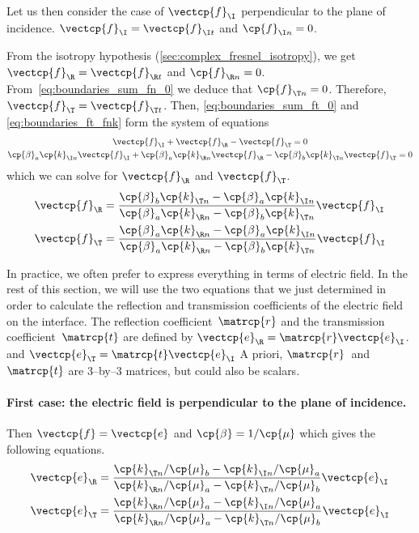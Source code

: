 Let us then consider the case of $\vectcp{f}_\I$ perpendicular to the plane of incidence.
$\vectcp{f}_\I=\vectcp{f}_{\I t}$ and $\cp{f}_{\I n}=0$.

From the isotropy hypothesis (\cref{sec:complex_fresnel_isotropy}), we get $\vectcp{f}_\R=\vectcp{f}_{\R t}$ and $\cp{f}_{\R n}=0$.
From~\cref{eq:boundaries_sum_fn_0} we deduce that $\cp{f}_{\T n}=0$.
Therefore, $\vectcp{f}_\T=\vectcp{f}_{\T t}$.
Then, \cref{eq:boundaries_sum_ft_0} and \cref{eq:boundaries_ft_fnk} form the system of equations
\begin{gather}
    \vectcp{f}_\I
    +
    \vectcp{f}_\R
    -
    \vectcp{f}_\T
    = 0
    \\
    \cp{\beta}_a \cp{k}_{\I n} \vectcp{f}_\I
    +
    \cp{\beta}_a \cp{k}_{\R n} \vectcp{f}_\R
    -
    \cp{\beta}_b \cp{k}_{\T n} \vectcp{f}_\T
    =
    0
\end{gather}
which we can solve for $\vectcp{f}_\R$ and $\vectcp{f}_\T$.
\begin{align}
    \vectcp{f}_\R
    &=
    \frac{
        \cp{\beta}_b \cp{k}_{\T n} - \cp{\beta}_a \cp{k}_{\I n}
    }{
        \cp{\beta}_a \cp{k}_{\R n} - \cp{\beta}_b \cp{k}_{\T n}
    }
    \vectcp{f}_\I
    \\
    \vectcp{f}_\T
    &=
    \frac{
        \cp{\beta}_a \cp{k}_{\R n} - \cp{\beta}_a \cp{k}_{\I n}
    }{
        \cp{\beta}_a \cp{k}_{\R n} - \cp{\beta}_b \cp{k}_{\T n}
    }
    \vectcp{f}_\I
\end{align}

In practice, we often prefer to express everything in terms of electric field.
In the rest of this section, we will use the two equations that we just determined in order to calculate the reflection and transmission coefficients of the electric field on the interface.
The reflection coefficient~$\matrcp{r}$ and the transmission coefficient~$\matrcp{t}$ are defined by
$\vectcp{e}_\R = \matrcp{r} \vectcp{e}_\I$.
and
$\vectcp{e}_\T = \matrcp{t} \vectcp{e}_\I$
A priori, $\matrcp{r}$~and $\matrcp{t}$ are 3--by--3 matrices, but could also be scalars.


\paragraph{First case: the electric field is perpendicular to the plane of incidence.}
Then $\vectcp{f}=\vectcp{e}$ and $\cp{\beta}=1/\cp{\mu}$ which gives the following equations.
\begin{align}
    \vectcp{e}_\R
    &=
    \frac{
        \cp{k}_{\T n} / \cp{\mu}_b - \cp{k}_{\I n} / \cp{\mu}_a
    }{
        \cp{k}_{\R n} / \cp{\mu}_a - \cp{k}_{\T n} / \cp{\mu}_b
    }
    \vectcp{e}_\I
    \\
    \vectcp{e}_\T
    &=
    \frac{
        \cp{k}_{\R n} / \cp{\mu}_a - \cp{k}_{\I n} / \cp{\mu}_a
    }{
        \cp{k}_{\R n} / \cp{\mu}_a - \cp{k}_{\T n} / \cp{\mu}_b
    }
    \vectcp{e}_\I
\end{align}

